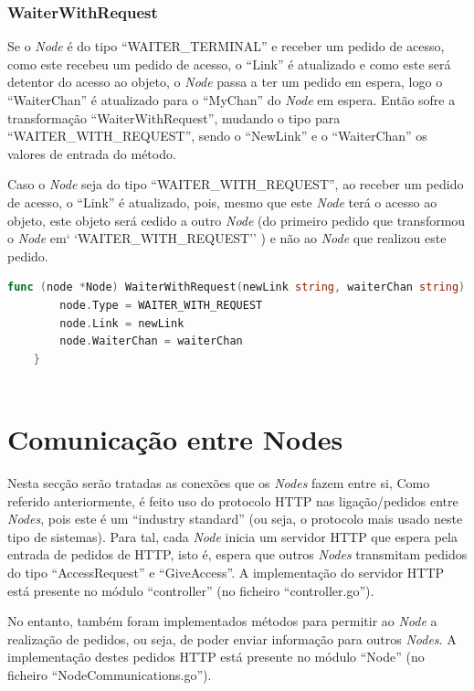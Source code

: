 \subsubsection*{WaiterWithRequest}

Se o \emph{Node} é do tipo ``WAITER\_TERMINAL'' e receber um pedido de acesso, 
como este recebeu um pedido de acesso, o ``Link'' é atualizado e
como este será detentor do acesso ao objeto, o \emph{Node} passa a ter um pedido em espera, logo o ``WaiterChan'' é atualizado para o ``MyChan'' do \emph{Node} em espera.
Então sofre a transformação ``WaiterWithRequest'', mudando o tipo para ``WAITER\_WITH\_REQUEST'', sendo o ``NewLink'' e o ``WaiterChan'' os valores de entrada do método.

Caso o \emph{Node} seja do tipo ``WAITER\_WITH\_REQUEST'', ao receber um pedido de acesso, 
o ``Link'' é atualizado, pois, mesmo que este \emph{Node} terá o acesso ao objeto, este objeto será cedido a outro \emph{Node} (do primeiro pedido que transformou o \emph{Node} em` `WAITER\_WITH\_REQUEST'' ) 
e não ao
\emph{Node} que realizou este pedido.

\begin{lstlisting}[caption={Método/transformação ``WaiterWithRequest''},language=Go]
	func (node *Node) WaiterWithRequest(newLink string, waiterChan string) {
		node.Type = WAITER_WITH_REQUEST
		node.Link = newLink
		node.WaiterChan = waiterChan
	}
	
\end{lstlisting}

\section{Comunicação entre Nodes}
\label{implementacao:sec:comunicacao}

Nesta secção serão tratadas as conexões que os \emph{Nodes} fazem entre si,
Como referido anteriormente, é feito uso do protocolo \acs{HTTP} nas ligação/pedidos entre \emph{Nodes}, pois este é um ``industry standard'' (ou seja, o protocolo mais usado neste tipo de sistemas).
Para tal, cada \emph{Node} inicia um servidor \acs{HTTP} que espera pela entrada de pedidos de \acs{HTTP}, isto é, espera que outros \emph{Nodes} transmitam pedidos do tipo ``AccessRequest'' e ``GiveAccess''.
A implementação do servidor \acs{HTTP} está presente no módulo ``controller'' (no ficheiro ``controller.go'').

No entanto, também foram implementados métodos para permitir ao \emph{Node} a realização de pedidos, ou seja, de poder enviar informação para outros \emph{Nodes}.
A implementação destes pedidos \acs{HTTP} está presente no módulo ``Node'' (no ficheiro ``NodeCommunications.go'').


